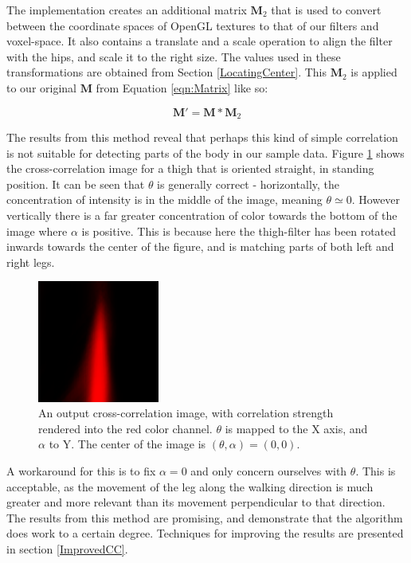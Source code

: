The implementation creates an additional matrix $\mathbf{M}_2$ that is used to convert between the coordinate spaces of OpenGL textures to that of our filters and voxel-space.
It also contains a translate and a scale operation to align the filter with the hips, and scale it to the right size.
The values used in these transformations are obtained from Section \ref{LocatingCenter}.
This $\mathbf{M}_2$ is applied to our original $\mathbf{M}$ from Equation \ref{eqn:Matrix} like so:

\begin{equation}
	\mathbf{M}' = \mathbf{M} * \mathbf{M}_2
\end{equation}

\bigskip
\noindent The results from this method reveal that perhaps this kind of simple correlation is not suitable for detecting parts of the body in our sample data.
Figure \ref{ParameterSpace} shows the cross-correlation image for a thigh that is oriented straight, in standing position.
It can be seen that $\theta$ is generally correct - horizontally, the concentration of intensity is in the middle of the image, meaning $\theta \simeq 0$.
However vertically there is a far greater concentration of color towards the bottom of the image where $\alpha$ is positive.
This is because here the thigh-filter has been rotated inwards towards the center of the figure, and is matching parts of both left and right legs.

\begin{figure}[tb]
	\vspace{-10pt}
	\centering
	\includegraphics[height=4cm]{parameterspace.png}
	\caption{An output cross-correlation image, with correlation strength rendered into the red color channel.
		$\theta$ is mapped to the X axis, and $\alpha$ to Y.
		The center of the image is $(\theta, \alpha) = (0,0)$.}
	\label{ParameterSpace}
\end{figure}

A workaround for this is to fix $\alpha = 0$ and only concern ourselves with $\theta$.
This is acceptable, as the movement of the leg along the walking direction is much greater and more relevant \cite{GaitBook} than its movement perpendicular to that direction.
The results from this method are promising, and demonstrate that the algorithm does work to a certain degree.
Techniques for improving the results are presented in section \ref{ImprovedCC}.


